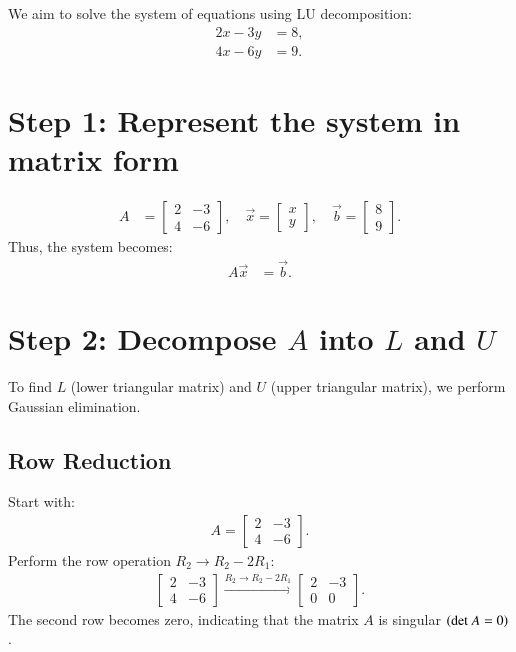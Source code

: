 \documentclass[journal]{IEEEtran}
\begin{document}
We aim to solve the system of equations using LU decomposition:
\begin{align}
    2x - 3y &= 8, \\
    4x - 6y &= 9.
\end{align}

\section*{Step 1: Represent the system in matrix form}
\begin{align}
    A &= \begin{bmatrix} 2 & -3 \\ 4 & -6 \end{bmatrix}, \quad
    \vec{x} = \begin{bmatrix} x \\ y \end{bmatrix}, \quad
    \vec{b} = \begin{bmatrix} 8 \\ 9 \end{bmatrix}.
\end{align}
Thus, the system becomes:
\begin{align}
    A \vec{x} &= \vec{b}.
\end{align}

\section*{Step 2: Decompose \(A\) into \(L\) and \(U\)}
To find \(L\) (lower triangular matrix) and \(U\) (upper triangular matrix), we perform Gaussian elimination.

\subsection*{Row Reduction}
Start with:
\begin{align}
    A = \begin{bmatrix} 2 & -3 \\ 4 & -6 \end{bmatrix}.
\end{align}
Perform the row operation \(R_2 \to R_2 - 2R_1\):
\begin{align}
    \begin{bmatrix} 2 & -3 \\ 4 & -6 \end{bmatrix}
    \xrightarrow{R_2 \to R_2 - 2R_1}
    \begin{bmatrix} 2 & -3 \\ 0 & 0 \end{bmatrix}.
\end{align}
The second row becomes zero, indicating that the matrix \(A\) is singular $\left(\text{det }A = 0\right)$.
\end{document}

